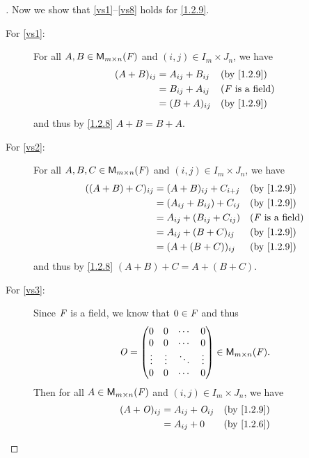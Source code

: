 \begin{proof}[]
  Now we show that \ref{vs1}--\ref{vs8} holds for \cref{1.2.9}.
  \begin{description}
    \item[For \ref{vs1}:]
      For all \(A, B \in \ms\) and \((i, j) \in I_m \times J_n\), we have
      \begin{align*}
        (A + B)_{i j} & = A_{i j} + B_{i j} &  & \by{1.2.9}                 \\
                      & = B_{i j} + A_{i j} &  & \text{(\(\F\) is a field)} \\
                      & = (B + A)_{i j}     &  & \by{1.2.9}
      \end{align*}
      and thus by \cref{1.2.8} \(A + B = B + A\).
    \item[For \ref{vs2}:]
      For all \(A, B, C \in \ms\) and \((i, j) \in I_m \times J_n\), we have
      \begin{align*}
        ((A + B) + C)_{i j} & = (A + B)_{i j} + C_{i + j}     &  & \by{1.2.9}                 \\
                            & = (A_{i j} + B_{i j}) + C_{i j} &  & \by{1.2.9}                 \\
                            & = A_{i j} + (B_{i j} + C_{i j}) &  & \text{(\(\F\) is a field)} \\
                            & = A_{i j} + (B + C)_{i j}       &  & \by{1.2.9}                 \\
                            & = (A + (B + C))_{i j}           &  & \by{1.2.9}
      \end{align*}
      and thus by \cref{1.2.8} \((A + B) + C = A + (B + C)\).
    \item[For \ref{vs3}:]
      Since \(\mathit{F}\) is a field, we know that \(0 \in \mathit{F}\) and thus
      \[
        \zm = \begin{pmatrix}
          0      & 0      & \cdots & 0      \\
          0      & 0      & \cdots & 0      \\
          \vdots & \vdots & \ddots & \vdots \\
          0      & 0      & \cdots & 0
        \end{pmatrix} \in \ms.
      \]
      Then for all \(A \in \ms\) and \((i, j) \in I_m \times J_n\), we have
      \begin{align*}
        (A + \zm)_{i j} & = A_{i j} + \zm_{i j} &  & \by{1.2.9}                 \\
                        & = A_{i j} + 0         &  & \by{1.2.6}                 \\

\end{align*}
\end{description}
\end{proof}
